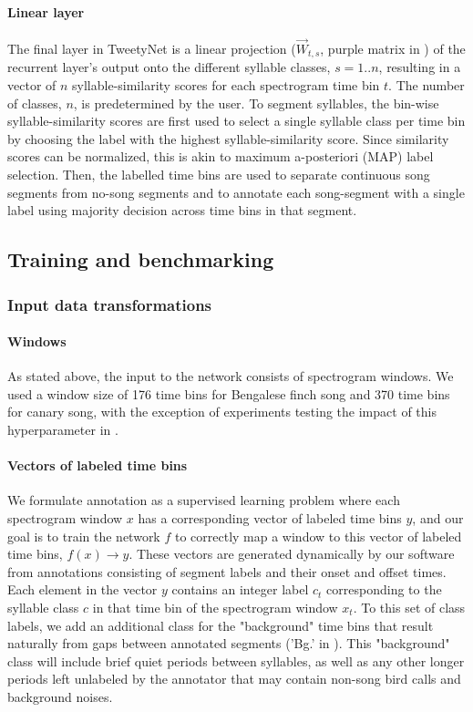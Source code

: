 \documentclass[9pt,lineno]{elife}
\begin{document}
\paragraph{Linear layer}

The final layer in TweetyNet is a linear projection ($\overrightarrow{W}_{t,s}$, 
purple matrix in ) of the recurrent layer's output 
onto the different syllable classes, $s=1..n$, 
resulting in a vector of $n$ syllable-similarity scores for each spectrogram time bin $t$. 
The number of classes, $n$, is predetermined by the user.
To segment syllables, the bin-wise syllable-similarity scores are first used to select a single syllable class per time bin by choosing the label with the highest syllable-similarity score. Since similarity scores can be normalized, this is akin to maximum a-posteriori (MAP) label selection. Then, the labelled time bins are used to separate continuous song segments from no-song segments and to annotate each song-segment with a single label using majority decision across time bins in that segment.  

\subsection{Training and benchmarking}
\label{methods:training-benchmarking}
\subsubsection{Input data transformations}
\paragraph{Windows}
As stated above, the input to the network consists of spectrogram windows. 
We used a window size of 176 time bins for Bengalese finch song 
and 370 time bins for canary song,
with the exception of experiments testing the impact of this hyperparameter 
in .

\paragraph{Vectors of labeled time bins}
We formulate annotation as a supervised learning problem 
where each spectrogram window $x$ 
has a corresponding vector of labeled time bins $y$, 
and our goal is to train the network $f$ to correctly map a window to 
this vector of labeled time bins, $f(x) \longrightarrow y$.
These vectors are generated dynamically by our software 
from annotations consisting of segment labels and their onset and offset times.
Each element in the vector $y$ contains an integer label $c_t$
corresponding to the syllable class $c$ in that 
time bin of the spectrogram window $x_t$.
To this set of class labels, 
we add an additional class 
for the "background" time bins that result naturally 
from gaps between annotated segments 
('Bg.' in ).
This "background" class will include brief quiet periods between syllables, 
as well as any other longer periods left unlabeled by the annotator 
that may contain non-song bird calls and background noises.
\end{document}
